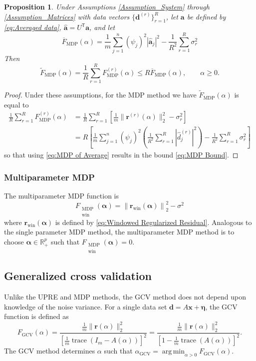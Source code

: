 \documentclass[12pt]{article}
\newcommand{\mA}{m}	%
\newcommand{\aVec}{\mathbf{a}}	%
\newcommand{\dVec}{\mathbf{d}}	%
\newcommand{\rVec}{\mathbf{r}}	%
\newcommand{\xVec}{\mathbf{x}}	%
\newcommand{\trans}[1]{{#1}^\mathsf{T}}	%
\DeclareMathOperator{\trace}{trace}		%
\newcommand{\dft}[1]{\widehat{#1}}	%
\newcommand{\regparam}{\alpha}  %
\newcommand{\regparamVec}{\bm{\regparam}}   %
\DeclareMathOperator*{\argmin}{arg\,min}
\newcommand{\mfilt}{\psi}
\newcommand{\noise}{\eta}	%
\newcommand{\noiseSD}{\sigma}	%
\newcommand{\noiseVec}{\bm{\noise}}	%
\newcommand{\rReg}{\rVec(\regparam)}	%
\newcommand{\A}{A(\regparam)}	%
\newcommand{\G}{F_{\text{GCV}}}	%
\newcommand{\D}{F_{\text{MDP}}}	%
\newcommand{\DAvg}{\overline{F}_{\text{MDP}}}	%
\newcommand{\DBig}{\widetilde{F}_{\text{MDP}}}	%
\newcommand{\DWin}{F_{\substack{\text{MDP} \\ \text{win}}}}	%
\newtheorem{proposition}{Proposition}[section]
\begin{document}
\begin{proposition}
Under Assumptions \ref{Assumption_System} through \ref{Assumption_Matrices} with data vectors $\{\dVec^{(r)}\}_{r=1}^R$, let $\aVec$ be defined by \eqref{eq:Averaged data}, $\dft{\aVec} = \trans{U}\aVec$, and let
\begin{equation}
\label{eq:MDP of Average}
\DAvg(\regparam) = \frac{1}{\mA}\sum_{j=1}^{n} \left(\mfilt_j\right)^2 |\dft{\aVec}_j|^2 - \frac{1}{R^2}\sum_{r=1}^R \noiseSD_{r}^2
\end{equation}
Then
\begin{equation}
\label{eq:MDP Bound}
\DBig(\regparam) = \frac{1}{R} \sum_{r=1}^R \D^{(r)}(\regparam) \leq R \DAvg(\regparam), \qquad \regparam \geq 0.
\end{equation}
\end{proposition}
\begin{proof}
Under these assumptions, for the MDP method we have $\DBig(\regparam)$ is equal to
\begin{align*}
    \frac{1}{R} \sum_{r=1}^R \D^{(r)}(\regparam) &= \frac{1}{R}\sum_{r=1}^R \left[\frac{1}{\mA}\|\rVec^{(r)}(\regparam)\|_2^2 - \noiseSD_{r}^2\right] \\
    &= R\left[\frac{1}{\mA}\sum_{j=1}^{n} \left(\mfilt_j\right)^2\left(\frac{1}{R^2} \sum_{r=1}^R |\dft{d}_j^{(r)}|^2\right) - \frac{1}{R^2}\sum_{r=1}^R \noiseSD_{r}^2\right]
\end{align*}
so that using \eqref{eq:MDP of Average} results in the bound \eqref{eq:MDP Bound}.
\end{proof}

\subsubsection{Multiparameter MDP} \label{sec:Multiparameter MDP}
The multiparameter MDP function is
\begin{equation}
\label{eq:Windowed MDP}
    \DWin(\regparamVec) = \left\|\rVec_\text{win}(\regparamVec)\right\|_2^2 - \noiseSD^2
\end{equation}
where $\rVec_\text{win}(\regparamVec)$ is defined by \eqref{eq:Windowed Regularized Residual}. Analogous to the single parameter MDP method, the multiparameter MDP method is to choose $\regparamVec \in \mathbb{R}_+^p$ such that $\DWin(\regparamVec) = 0$.

\subsection{Generalized cross validation} \label{sec:GCV}
Unlike the UPRE and MDP methods, the GCV method does not depend upon knowledge of the noise variance. For a single data set $\dVec = A\xVec + \noiseVec$, the GCV function is defined as
\begin{equation}
\label{eq:GCV}
\G(\regparam) = \frac{\frac{1}{\mA}\|\rReg\|_2^2}{\left[\frac{1}{\mA}\trace(I_{\mA} - \A)\right]^2} = \frac{\frac{1}{\mA}\|\rReg\|_2^2}{\left[1 - \frac{1}{\mA}\trace(\A)\right]^2}.
\end{equation}
The GCV method determines $\regparam$ such that $\regparam_{\text{GCV}} = \argmin_{\regparam > 0} \G(\regparam)$.
\end{document}
